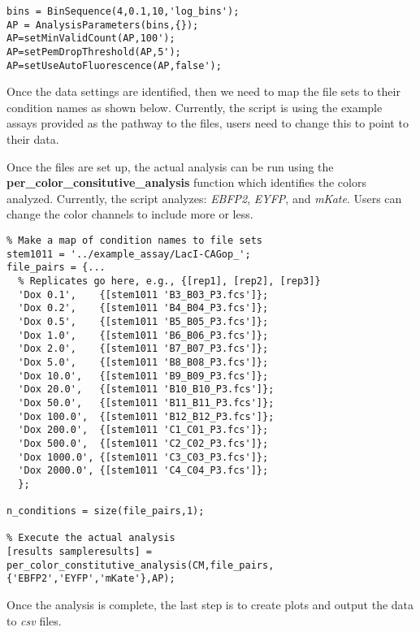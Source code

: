 \begin{minipage}{0.95\textwidth} 
\begin{lstlisting}
bins = BinSequence(4,0.1,10,'log_bins');
AP = AnalysisParameters(bins,{});
AP=setMinValidCount(AP,100');
AP=setPemDropThreshold(AP,5');
AP=setUseAutoFluorescence(AP,false');
\end{lstlisting}
\end{minipage}

Once the data settings are identified, then we need to map the file sets to their condition names as shown below. Currently, the script is using the example assays provided as the pathway to the files, users need to change this to point to their data. 

Once the files are set up, the actual analysis can be run using the \textbf{per\_color\_consitutive\_analysis} function which identifies the colors analyzed. Currently, the script analyzes: \textit{EBFP2}, \textit{EYFP}, and \textit{mKate}. Users can change the color channels to include more or less. 

\begin{minipage}{0.95\textwidth} 
\begin{lstlisting}
% Make a map of condition names to file sets
stem1011 = '../example_assay/LacI-CAGop_';
file_pairs = {...
  % Replicates go here, e.g., {[rep1], [rep2], [rep3]}
  'Dox 0.1',    {[stem1011 'B3_B03_P3.fcs']}; 
  'Dox 0.2',    {[stem1011 'B4_B04_P3.fcs']};
  'Dox 0.5',    {[stem1011 'B5_B05_P3.fcs']};
  'Dox 1.0',    {[stem1011 'B6_B06_P3.fcs']};
  'Dox 2.0',    {[stem1011 'B7_B07_P3.fcs']};
  'Dox 5.0',    {[stem1011 'B8_B08_P3.fcs']};
  'Dox 10.0',   {[stem1011 'B9_B09_P3.fcs']};
  'Dox 20.0',   {[stem1011 'B10_B10_P3.fcs']};
  'Dox 50.0',   {[stem1011 'B11_B11_P3.fcs']};
  'Dox 100.0',  {[stem1011 'B12_B12_P3.fcs']};
  'Dox 200.0',  {[stem1011 'C1_C01_P3.fcs']};
  'Dox 500.0',  {[stem1011 'C2_C02_P3.fcs']};
  'Dox 1000.0', {[stem1011 'C3_C03_P3.fcs']};
  'Dox 2000.0', {[stem1011 'C4_C04_P3.fcs']};
  };

n_conditions = size(file_pairs,1);

% Execute the actual analysis
[results sampleresults] = per_color_constitutive_analysis(CM,file_pairs,{'EBFP2','EYFP','mKate'},AP);
\end{lstlisting}
\end{minipage}

Once the analysis is complete, the last step is to create plots and output the data to \textit{csv} files. 

